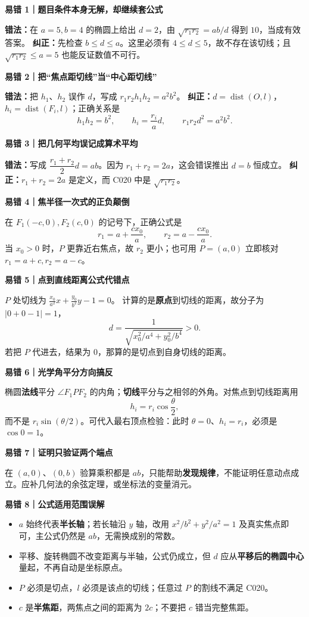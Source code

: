 \begin{trapbox}
\textbf{\textcolor{CTrap}{易错 1｜题目条件本身无解，却继续套公式}}

\textbf{错法：}在 $a=5,b=4$ 的椭圆上给出 $d=2$，由 $\sqrt{r_1r_2}=ab/d$ 得到 $10$，当成有效答案。
\textbf{纠正：}先检查 $\boxed{b\le d\le a}$。这里必须有 $4\le d\le5$，故不存在该切线；且 $\sqrt{r_1r_2}\le a=5$ 也能反证数值不可行。

\medskip
\textbf{\textcolor{CTrap}{易错 2｜把“焦点距切线”当“中心距切线”}}

\textbf{错法：}把 $h_1$、$h_2$ 误作 $d$，写成 $r_1r_2h_1h_2=a^2b^2$。
\textbf{纠正：}$d=\operatorname{dist}(O,l)$，$h_i=\operatorname{dist}(F_i,l)$；正确关系是
\[
\boxed{h_1h_2=b^2},\qquad
\boxed{h_i=\frac{r_i}{a}d},\qquad
\boxed{r_1r_2d^2=a^2b^2}.
\]

\medskip
\textbf{\textcolor{CTrap}{易错 3｜把几何平均误记成算术平均}}

\textbf{错法：}写成 $\dfrac{r_1+r_2}{2}d=ab$。因为 $r_1+r_2=2a$，这会错误推出 $d=b$ 恒成立。
\textbf{纠正：}$r_1+r_2=2a$ 是定义，而 C020 中是 $\sqrt{r_1r_2}$。

\medskip
\textbf{\textcolor{CTrap}{易错 4｜焦半径一次式的正负颠倒}}

在 $F_1(-c,0),F_2(c,0)$ 的记号下，正确公式是
\[
\boxed{r_1=a+\frac{cx_0}{a}},\qquad
\boxed{r_2=a-\frac{cx_0}{a}}.
\]
当 $x_0>0$ 时，$P$ 更靠近右焦点，故 $r_2$ 更小；也可用 $P=(a,0)$ 立即核对 $r_1=a+c,r_2=a-c$。

\medskip
\textbf{\textcolor{CTrap}{易错 5｜点到直线距离公式代错点}}

$P$ 处切线为 $\frac{x_0}{a^2}x+\frac{y_0}{b^2}y-1=0$。
计算的是\textbf{原点}到切线的距离，故分子为 $|0+0-1|=1$，
\[
d=\frac1{\sqrt{x_0^2/a^4+y_0^2/b^4}}>0.
\]
若把 $P$ 代进去，结果为 $0$，那算的是切点到自身切线的距离。

\medskip
\textbf{\textcolor{CTrap}{易错 6｜光学角平分方向搞反}}

椭圆\textbf{法线}平分 $\angle F_1PF_2$ 的内角；\textbf{切线}平分与之相邻的外角。对焦点到切线距离用
\[
h_i=r_i\cos\frac\theta2,
\]
而不是 $r_i\sin(\theta/2)$。可代入最右顶点检验：此时 $\theta=0$、$h_i=r_i$，必须是 $\cos0=1$。

\medskip
\textbf{\textcolor{CTrap}{易错 7｜证明只验证两个端点}}

在 $(a,0)$、$(0,b)$ 验算乘积都是 $ab$，只能帮助\textbf{发现规律}，不能证明任意动点成立。应补几何法的余弦定理，或坐标法的变量消元。

\medskip
\textbf{\textcolor{CTrap}{易错 8｜公式适用范围误解}}

\begin{itemize}[leftmargin=*,itemsep=0.3em]
\item $a$ 始终代表\textbf{半长轴}；若长轴沿 $y$ 轴，改用 $x^2/b^2+y^2/a^2=1$ 及真实焦点即可，主公式仍然是 $ab$，无需换成别的常数。
\item 平移、旋转椭圆不改变距离与半轴，公式仍成立，但 $d$ 应从\textbf{平移后的椭圆中心}量起，不再自动是坐标原点。
\item $P$ 必须是切点，$l$ 必须是该点的切线；任意过 $P$ 的割线不满足 C020。
\item $c$ 是\textbf{半焦距}，两焦点之间的距离为 $2c$；不要把 $c$ 错当完整焦距。
\end{itemize}
\end{trapbox}
